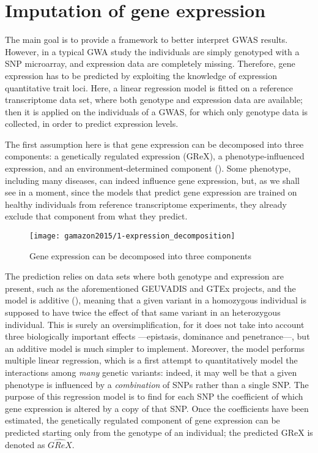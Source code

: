 \documentclass[../main.tex]{subfiles}
\begin{document}
\section{Imputation of gene expression}

The main goal is to provide a framework to better interpret GWAS 
results. However, in a typical GWA study the individuals are simply 
genotyped with a SNP microarray, and expression data are completely 
missing. Therefore, gene expression has to be predicted by exploiting 
the knowledge of expression quantitative trait loci. Here, a linear 
regression model is fitted on a reference transcriptome data set, where 
both genotype and expression data are available; then it is applied on 
the individuals of a GWAS, for which only genotype data is collected, in 
order to predict expression levels.

The first assumption here is that gene expression can be decomposed into 
three components: a genetically regulated expression (GReX), a 
phenotype-influenced expression, and an environment-determined component 
(). Some phenotype, including many diseases, can 
indeed influence gene expression, but, as we shall see in a moment, 
since the models that predict gene expression are trained on healthy 
individuals from reference transcriptome experiments, they already 
exclude that component from what they predict.

\begin{figure}
	\centering
	\texttt{[image: gamazon2015/1-expression\_decomposition]}
	\caption{Gene expression can be decomposed into three components}
\end{figure}

The prediction relies on data sets where both genotype and expression 
are present, such as the aforementioned GEUVADIS and GTEx projects, and 
the model is additive (), meaning that a given 
variant in a homozygous individual is supposed to have twice the effect 
of that same variant in an heterozygous individual. This is surely an 
oversimplification, for it does not take into account three biologically 
important effects ---epistasis, dominance and penetrance---, but an 
additive model is much simpler to implement. Moreover, the model 
performs multiple linear regression, which is a first attempt to 
quantitatively model the interactions among \textit{many} genetic 
variants: indeed, it may well be that a given phenotype is influenced by 
a \textit{combination} of SNPs rather than a single SNP. The purpose of 
this regression model is to find for each SNP the coefficient of which 
gene expression is altered by a copy of that SNP. Once the coefficients 
have been estimated, the genetically regulated component of gene 
expression can be predicted starting only from the genotype of an 
individual; the predicted GReX is denoted as $\widehat{GReX}$.
\end{document}
